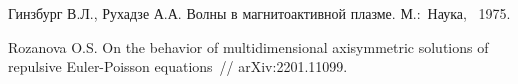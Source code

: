 \begin{thebibliography}{9} %
  Гинзбург В.Л., Рухадзе А.А. Волны в магнитоактивной плазме. М.:~Наука,~ 1975.  

 Rozanova O.S. On the behavior of multidimensional axisymmetric solutions of repulsive Euler-Poisson equations~//  arXiv:2201.11099. 
\end{thebibliography}




%

